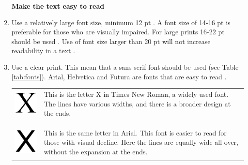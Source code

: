 \begin{enumerate}[{g}.1]
\newpage
\textbf{Make the text easy to read} 

\item Use a relatively large font size, minimum 12 pt \cite{blindeforbundetTekst}. A font size of 14-16 pt is preferable for those who are visually impaired. For large prints 16-22 pt should be used \cite{actionforblindpeopleTekst}. Use of font size larger than 20 pt will not increase readability in a text \cite{blindeforbundetTekst}.     
\item Use a clear print. This mean that a sans serif font should be used (see Table \ref{tab:fonts}). Arial, Helvetica and Futura are fonts that are easy to read \cite{actionforblindpeopleTekst}.

\begin{table}
\centering
\begin{tabular}{ l p{8cm} }

\multirow{1}{*}{\includegraphics[scale=0.6]{font1.jpg}} & This is the letter X in Times New Roman, a widely used font. The lines have various widths, and there is a broader design at the ends. \\ \\ \\ \\
\multirow{1}{*}{\includegraphics[scale=0.6]{font2.jpg}} & This is the same letter in Arial. This font is easier to read for those with visual decline. Here the lines are equally wide all over, without the expansion at the ends. \\ \\


\end{tabular}
\end{table}
\end{enumerate}
